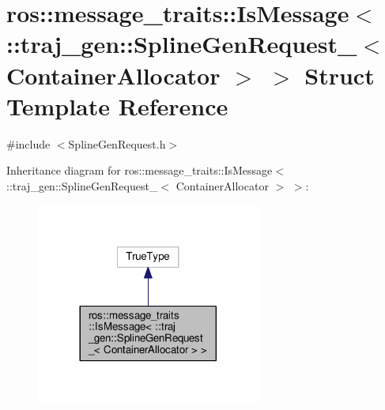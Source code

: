 \hypertarget{structros_1_1message__traits_1_1_is_message_3_01_1_1traj__gen_1_1_spline_gen_request___3_01_container_allocator_01_4_01_4}{}\section{ros\+:\+:message\+\_\+traits\+:\+:Is\+Message$<$ \+:\+:traj\+\_\+gen\+:\+:Spline\+Gen\+Request\+\_\+$<$ Container\+Allocator $>$ $>$ Struct Template Reference}
\label{structros_1_1message__traits_1_1_is_message_3_01_1_1traj__gen_1_1_spline_gen_request___3_01_container_allocator_01_4_01_4}


{\ttfamily \#include $<$Spline\+Gen\+Request.\+h$>$}



Inheritance diagram for ros\+:\+:message\+\_\+traits\+:\+:Is\+Message$<$ \+:\+:traj\+\_\+gen\+:\+:Spline\+Gen\+Request\+\_\+$<$ Container\+Allocator $>$ $>$\+:
\nopagebreak
\begin{figure}[H]
\begin{center}
\leavevmode
\includegraphics[width=209pt]{structros_1_1message__traits_1_1_is_message_3_01_1_1traj__gen_1_1_spline_gen_request___3_01_cont141e7e3c4e2a5fa143f571458d1bbf52}
\end{center}
\end{figure}


